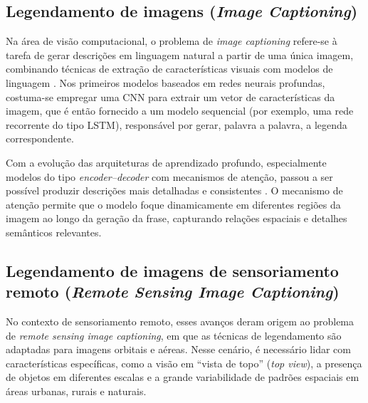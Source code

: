 \subsection{Legendamento de imagens (\textit{Image Captioning})}

Na área de visão computacional, o problema de \textit{image captioning} refere-se à tarefa de gerar descrições em linguagem natural a partir de uma única imagem, combinando técnicas de extração de características visuais com modelos de linguagem \cite{vinyals2015,anderson2018}. Nos primeiros modelos baseados em redes neurais profundas, costuma-se empregar uma CNN para extrair um vetor de características da imagem, que é então fornecido a um modelo sequencial (por exemplo, uma rede recorrente do tipo LSTM), responsável por gerar, palavra a palavra, a legenda correspondente.


Com a evolução das arquiteturas de aprendizado profundo, especialmente modelos do tipo \textit{encoder--decoder} com mecanismos de atenção, passou a ser possível produzir descrições mais detalhadas e consistentes \cite{anderson2018}. O mecanismo de atenção permite que o modelo foque dinamicamente em diferentes regiões da imagem ao longo da geração da frase, capturando relações espaciais e detalhes semânticos relevantes.

\subsection{Legendamento de imagens de sensoriamento remoto (\textit{Remote Sensing Image Captioning})}


No contexto de sensoriamento remoto, esses avanços deram origem ao problema de \textit{remote sensing image captioning}, em que as técnicas de legendamento são adaptadas para imagens orbitais e aéreas. Nesse cenário, é necessário lidar com características específicas, como a visão em ``vista de topo'' (\textit{top view}), a presença de objetos em diferentes escalas e a grande variabilidade de padrões espaciais em áreas urbanas, rurais e naturais.


